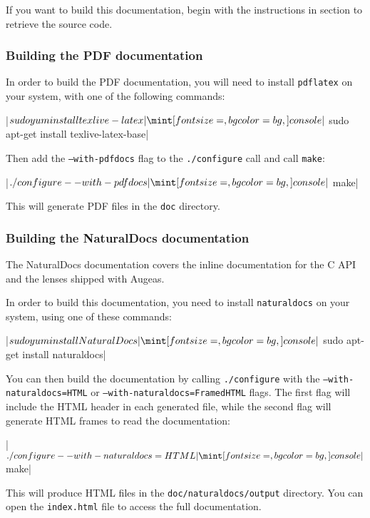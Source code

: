 If you want to build this documentation, begin with the instructions in section  to retrieve the source code.


\subsubsection{Building the PDF documentation}

In order to build the PDF documentation, you will need to install \verb!pdflatex! on your system, with one of the following commands:

\consolecode|$ sudo yum install texlive-latex|
\consolecode|$ sudo apt-get install texlive-latex-base|

Then add the \texttt{--with\allowbreak-pdfdocs} flag to the \texttt{./configure} call and call \texttt{make}:

\consolecode|$ ./configure --with-pdfdocs|
\consolecode|$ make|

This will generate PDF files in the \verb!doc! directory.


\subsubsection{Building the NaturalDocs documentation}

The NaturalDocs documentation covers the inline documentation for the C API and the lenses shipped with Augeas.


In order to build this documentation, you need to install \verb!naturaldocs! on your system, using one of these commands:

\consolecode|$ sudo yum install NaturalDocs|
\consolecode|$ sudo apt-get install naturaldocs|

You can then build the documentation by calling \texttt{./configure} with the \texttt{--with\allowbreak-naturaldocs=HTML} or \texttt{--with\allowbreak-naturaldocs=FramedHTML} flags. The first flag will include the HTML header in each generated file, while the second flag will generate HTML frames to read the documentation:

\consolecode|$ ./configure --with-naturaldocs=HTML|
\consolecode|$ make|

This will produce HTML files in the \verb!doc/naturaldocs/output! directory. You can open the \verb!index.html! file to access the full documentation.


